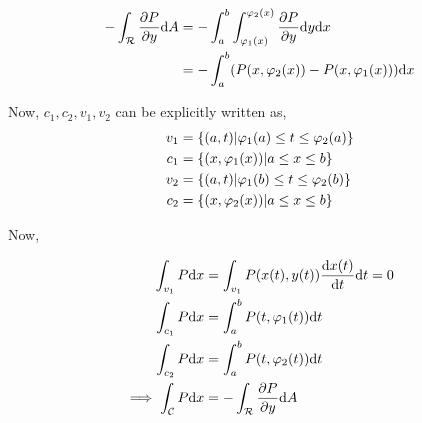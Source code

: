 \documentclass[Analysis-3]{subfiles}
\begin{document}
 \begin{align*}
    -\int_{\mathcal{R}} \pdv{P}{y} \dd A &= -\int_{a}^{b} \int_{\varphi_1(x)}^{\varphi_2(x)} \pdv{P}{y} \dd y \dd x \\
    &= - \int_{a}^{b} (P(x,\varphi_2(x))-P(x,\varphi_1(x))) \dd x \\
 \end{align*}

 Now, $c_1,c_2,v_1,v_2$ can be explicitly written as, 
 \begin{align*}
    v_1 &= \qty{(a,t) | \varphi_1(a) \le t \le \varphi_2(a)} \\
    c_1 &= \qty{(x,\varphi_1(x)) | a \le x \le b} \\
    v_2 &= \qty{(a,t) | \varphi_1(b) \le t \le \varphi_2(b)} \\
    c_2 &= \qty{(x,\varphi_2(x)) | a \le x \le b}
 \end{align*}

 Now,

 \begin{align*}
    \int_{v_1} P \dd x &= \int_{v_1} P(x(t),y(t)) \dv{x(t)}{t} \dd t = 0 \\
    \int_{c_1} P \dd x &= \int_{a}^{b} P(t,\varphi_1(t)) \dd t \\
    \int_{c_2} P \dd x &= \int_{a}^{b} P(t,\varphi_2(t)) \dd t \\
    \implies \int_{\mathcal{C}} P\dd x &= -\int_{\mathcal{R}} \pdv{P}{y} \dd A
 \end{align*}
\end{document}
